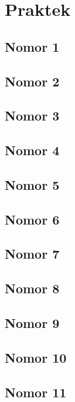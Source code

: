 \chapter{Praktek}

\section{Nomor 1}


\section{Nomor 2}


\section{Nomor 3}


\section{Nomor 4}


\section{Nomor 5}


\section{Nomor 6}


\section{Nomor 7}


\section{Nomor 8}


\section{Nomor 9}


\section{Nomor 10}


\section{Nomor 11}
